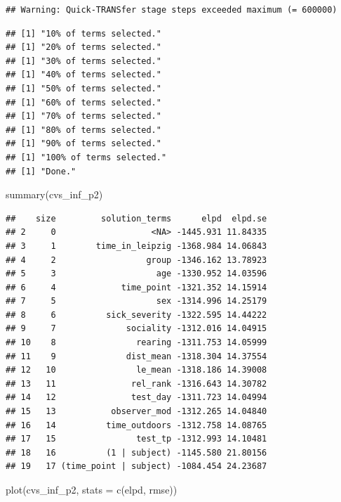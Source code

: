 \documentclass[
]{article}
\newenvironment{Shaded}{\begin{snugshade}}{\end{snugshade}}
\newcommand{\AttributeTok}[1]{\textcolor[rgb]{0.77,0.63,0.00}{#1}}
\newcommand{\FunctionTok}[1]{\textcolor[rgb]{0.00,0.00,0.00}{#1}}
\newcommand{\NormalTok}[1]{#1}
\newcommand{\StringTok}[1]{\textcolor[rgb]{0.31,0.60,0.02}{#1}}
\begin{document}
\begin{verbatim}
## Warning: Quick-TRANSfer stage steps exceeded maximum (= 600000)
\end{verbatim}

\begin{verbatim}
## [1] "10% of terms selected."
## [1] "20% of terms selected."
## [1] "30% of terms selected."
## [1] "40% of terms selected."
## [1] "50% of terms selected."
## [1] "60% of terms selected."
## [1] "70% of terms selected."
## [1] "80% of terms selected."
## [1] "90% of terms selected."
## [1] "100% of terms selected."
## [1] "Done."
\end{verbatim}

\begin{Shaded}
\begin{Highlighting}[]
\FunctionTok{summary}\NormalTok{(cvs\_inf\_p2)}
\end{Highlighting}
\end{Shaded}

\begin{verbatim}
##    size         solution_terms      elpd  elpd.se
## 2     0                   <NA> -1445.931 11.84335
## 3     1        time_in_leipzig -1368.984 14.06843
## 4     2                  group -1346.162 13.78923
## 5     3                    age -1330.952 14.03596
## 6     4             time_point -1321.352 14.15914
## 7     5                    sex -1314.996 14.25179
## 8     6          sick_severity -1322.595 14.44222
## 9     7              sociality -1312.016 14.04915
## 10    8                rearing -1311.753 14.05999
## 11    9              dist_mean -1318.304 14.37554
## 12   10                le_mean -1318.186 14.39008
## 13   11               rel_rank -1316.643 14.30782
## 14   12               test_day -1311.723 14.04994
## 15   13           observer_mod -1312.265 14.04840
## 16   14          time_outdoors -1312.758 14.08765
## 17   15                test_tp -1312.993 14.10481
## 18   16          (1 | subject) -1145.580 21.80156
## 19   17 (time_point | subject) -1084.454 24.23687
\end{verbatim}

\begin{Shaded}
\begin{Highlighting}[]
\FunctionTok{plot}\NormalTok{(cvs\_inf\_p2, }\AttributeTok{stats =} \FunctionTok{c}\NormalTok{(}\StringTok{\textquotesingle{}elpd\textquotesingle{}}\NormalTok{, }\StringTok{\textquotesingle{}rmse\textquotesingle{}}\NormalTok{))}
\end{Highlighting}
\end{Shaded}
\end{document}
